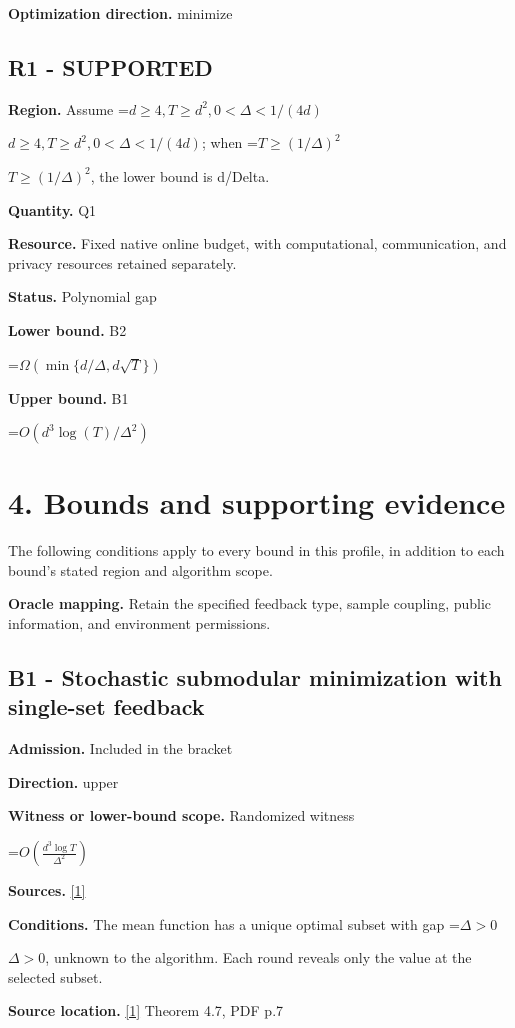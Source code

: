 \documentclass[10pt,a4paper]{article}
\newcommand{\AtlasMath}[1]{\par\begingroup\centering\setbox0=\hbox{$\displaystyle #1$}\ifdim\wd0>1.4\linewidth\typeout{ATLAS WIDE FORMULA: \the\wd0}\fi\ifdim\wd0>\linewidth\resizebox{\linewidth}{!}{\box0}\else\box0\fi\par\endgroup}
\newcommand{\AtlasInlineMath}[1]{\begingroup\setbox0=\hbox{$#1$}\ifdim\wd0>.4\linewidth\endgroup\AtlasMath{#1}\else\endgroup$#1$\fi}
\begin{document}
\textbf{Optimization direction.} minimize

\subsection{R1 - SUPPORTED}
\textbf{Region.} Assume \AtlasInlineMath{d\ge 4,T\ge d^{2},0<\Delta<1/(4d)}; when \AtlasInlineMath{T\ge (1/\Delta)^{2}}, the lower bound is d/Delta.

\textbf{Quantity.} Q1

\textbf{Resource.} Fixed native online budget, with computational, communication, and privacy resources retained separately.

\textbf{Status.} Polynomial gap

\textbf{Lower bound.} B2

\AtlasMath{\Omega(\min\{d/\Delta,d\sqrt T\})}
\textbf{Upper bound.} B1

\AtlasMath{O(d^3\log(T)/\Delta^2)}
\section{4. Bounds and supporting evidence}
The following conditions apply to every bound in this profile, in addition to each bound's stated region and algorithm scope.

\textbf{Oracle mapping.} Retain the specified feedback type, sample coupling, public information, and environment permissions.

\subsection{B1 - Stochastic submodular minimization with single-set feedback}
\textbf{Admission.} Included in the bracket

\textbf{Direction.} upper

\textbf{Witness or lower-bound scope.} Randomized witness

\AtlasMath{O\!\left(\frac{d^3\log T}{\Delta^2}\right)}
\textbf{Sources.} \href{https://proceedings.mlr.press/v162/ito22a/ito22a.pdf}{[1]}

\textbf{Conditions.} The mean function has a unique optimal subset with gap \AtlasInlineMath{\Delta>0}, unknown to the algorithm. Each round reveals only the value at the selected subset.

\textbf{Source location.} \href{https://proceedings.mlr.press/v162/ito22a/ito22a.pdf}{[1]} Theorem 4.7, PDF p.7
\end{document}
